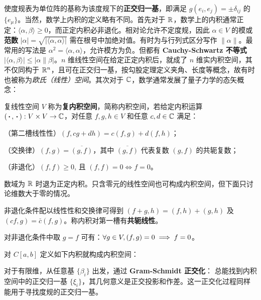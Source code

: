 使度规表为单位阵的基称为该度规下的\textbf{正交归一基}，即满足 $g(e_i,e_j)=\pm\delta_{ij}$ 的$\{e_{\mu}\}$。当然，数学上内积的定义略有不同。首先对于 $\mathbb{R}$，数学上的内积通常正定：$\langle\alpha,\beta\rangle\geqslant0$，而正定内积必非退化。相对论允许不定度规，因此 $\alpha \in V$ 的模或\textbf{范数} $|\alpha|=\sqrt{|\langle\alpha, \alpha\rangle|}$ 需在根号中加绝对值。有时为与行列式区分写作 $\|\alpha\|$。最常用的写法是 $\alpha^2=\langle\alpha, \alpha\rangle$，允许模方为负。但都有 \textbf{Cauchy-Schwartz 不等式} $|\langle\alpha, \beta\rangle| \leqslant|\alpha \| \beta|$。$n$ 维线性空间在给定正定内积后，就成了 $n$ 维实内积空间，其不仅同构于 $\mathbb{R}^n$，且可在正交归一基，按勾股定理定义夹角、长度等概念，故有时也被称为\textit{欧氏（线性）空间}。其次对于 $\mathbb{C}$，数学通常发展了量子力学的态矢概念：
\begin{definition}
    复线性空间 $V$ 称为\textbf{复内积空间}，简称内积空间，若给定内积运算 $(\oo, \oo): V \times V \rightarrow \C$，对任意 $f, g, h \in V$ 和任意 $c,d \in \mathbb{C}$ 满足：
    
    （第二槽线性性）$(f, cg+dh)=c(f, g)+d(f, h)$；
    
    （交换律）$(f, g)=\overline{(g, f)}$，其中 $\overline{(g, f)}$ 代表复数 $(g, f)$ 的共轭复数；
    
    （非退化）$(f, f) \geqslant 0$, 且 $(f, f)=0 \Leftrightarrow f=0$。
    \end{definition}
    \begin{remark}
        数域为 $\mathbb{R}$ 时退为正定内积。只含零元的线性空间也可构成内积空间，但下面只讨论维数大于零的情况。
    \end{remark}
    \begin{theorem}
    非退化条件配以线性性和交换律可得到 $(f+g, h)=(f, h)+(g, h)$ 及 $(c f, g)=\bar{c}(f, g)$。称内积对第一槽有\textbf{共轭线性}。
    \end{theorem}
    \begin{theorem}
    对非退化条件中取 $g=f$ 可有：$\forall g\in V,(f,g)=0\implies f=0$。
    \end{theorem}
    \begin{example}
        对 $C[a, b]$ 定义如下内积就构成内积空间：
\end{example}

对于有限维，从任意基 $\{\beta_i\}$ 出发，通过 \textbf{Gram-Schmidt 正交化}：
总能找到内积空间中的正交归一基 $\{\xi_i\}$，其几何意义是正交投影和作差。这一正交化过程同样能用于寻找度规的正交归一基。

